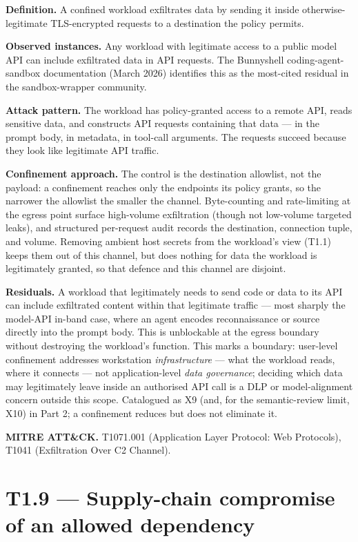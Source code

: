 \textbf{Definition.} A confined workload exfiltrates data by sending it
inside otherwise-legitimate TLS-encrypted requests to a destination the
policy permits.

\textbf{Observed instances.} Any workload with legitimate access to a
public model API can include exfiltrated data in API requests. The
Bunnyshell coding-agent-sandbox documentation (March 2026) identifies
this as the most-cited residual in the sandbox-wrapper community.

\textbf{Attack pattern.} The workload has policy-granted access to a
remote API, reads sensitive data, and constructs API requests containing
that data --- in the prompt body, in metadata, in tool-call arguments.
The requests succeed because they look like legitimate API traffic.

\textbf{Confinement approach.} The control is the destination allowlist,
not the payload: a confinement reaches only the endpoints its policy
grants, so the narrower the allowlist the smaller the channel.
Byte-counting and rate-limiting at the egress point surface high-volume
exfiltration (though not low-volume targeted leaks), and structured
per-request audit records the destination, connection tuple, and volume.
Removing ambient host secrets from the workload's view (T1.1) keeps them
out of this channel, but does nothing for data the workload is
legitimately granted, so that defence and this channel are disjoint.

\textbf{Residuals.} A workload that legitimately needs to send code or
data to its API can include exfiltrated content within that legitimate
traffic --- most sharply the model-API in-band case, where an agent
encodes reconnaissance or source directly into the prompt body. This is
unblockable at the egress boundary without destroying the workload's
function. This marks a boundary: user-level confinement addresses
workstation \emph{infrastructure} --- what the workload reads, where it
connects --- not application-level \emph{data governance}; deciding
which data may legitimately leave inside an authorised API call is a DLP
or model-alignment concern outside this scope. Catalogued as X9 (and,
for the semantic-review limit, X10) in Part 2; a confinement reduces but
does not eliminate it.

\textbf{MITRE ATT\&CK.} T1071.001 (Application Layer Protocol: Web
Protocols), T1041 (Exfiltration Over C2 Channel).

\hypertarget{t1.9-supply-chain-compromise-of-an-allowed-dependency}{%
\section{T1.9 --- Supply-chain compromise of an allowed
dependency}\label{t1.9-supply-chain-compromise-of-an-allowed-dependency}}

